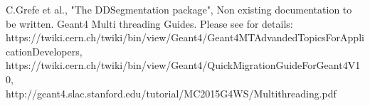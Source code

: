 \documentclass[10pt,a4paper]{article}
\begin{document}
\clearpage
%
%
\tableofcontents
\clearpage
%
%
\setcounter{page}{1}
\graphicspath{{./figs/}}







\newpage
\begin{thebibliography}{9}

 C.Grefe et al.,
                   "The DDSegmentation package", 
                   Non existing documentation to be written.
 Geant4 Multi threading Guides. 
	Please see for details:\\
	https://twiki.cern.ch/twiki/bin/view/Geant4/Geant4MTAdvandedTopicsForApplicationDevelopers,\\
	https://twiki.cern.ch/twiki/bin/view/Geant4/QuickMigrationGuideForGeant4V10,\\
	http://geant4.slac.stanford.edu/tutorial/MC2015G4WS/Multithreading.pdf

\end{thebibliography}
\end{document}
